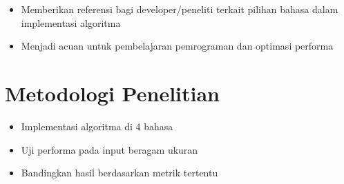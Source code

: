 
\begin{itemize}
	\item Memberikan referensi bagi developer/peneliti terkait pilihan bahasa dalam implementasi algoritma
	\item Menjadi acuan untuk pembelajaran pemrograman dan optimasi performa
\end{itemize}





\section{Metodologi Penelitian}
\label{sec:metodologiPenelitian}

\begin{itemize}
	\item Implementasi algoritma di 4 bahasa
	\item Uji performa pada input beragam ukuran
	\item Bandingkan hasil berdasarkan metrik tertentu
\end{itemize}


